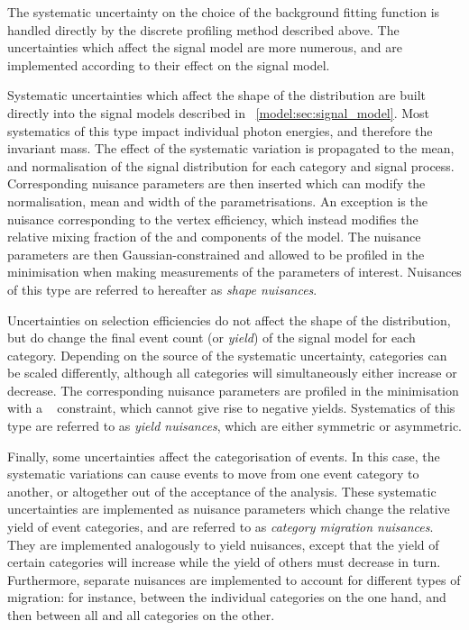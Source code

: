The systematic uncertainty on the choice of the background fitting function is handled directly by the discrete profiling method described above. The uncertainties which affect the signal model are more numerous, and are implemented according to their effect on the signal model.

Systematic uncertainties which affect the shape of the \mgg distribution are built directly into the signal models described in \Sec~\ref{model:sec:signal_model}. Most systematics of this type impact individual photon energies, and therefore the invariant mass. The effect of the systematic variation is propagated to the mean, \effSigma and normalisation of the signal \mgg distribution for each category and signal process. Corresponding nuisance parameters are then inserted which can modify the normalisation, mean and width of the \DCBpG parametrisations. An exception is the nuisance corresponding to the vertex efficiency, which instead modifies the relative mixing fraction of the \RV and \WV components of the model. The nuisance parameters are then Gaussian-constrained and allowed to be profiled in the \NLL minimisation when making measurements of the parameters of interest. Nuisances of this type are referred to hereafter as \emph{shape nuisances}. 

Uncertainties on selection efficiencies do not affect the shape of the \mgg distribution, but do change the final event count (or \emph{yield}) of the signal model for each category. Depending on the source of the systematic uncertainty, categories can be scaled differently, although all categories will simultaneously either increase or decrease. The corresponding nuisance parameters are profiled in the \NLL minimisation with a \lnN~\cite{1987lognormal} constraint, which cannot give rise to negative yields. Systematics of this type are referred to as \emph{yield nuisances}, which are either symmetric or asymmetric. %

Finally, some uncertainties affect the categorisation of events. In this case, the systematic variations can cause events to move from one event category to another, or altogether out of the acceptance of the analysis. These systematic uncertainties are implemented as nuisance parameters which change the relative yield of event categories, and are referred to as \emph{category migration nuisances}. They are implemented analogously to yield nuisances, except that the yield of certain categories will increase while the yield of others must decrease in turn. Furthermore, separate nuisances are implemented to account for different types of migration: for instance, between the individual \VBFTag categories on the one hand, and then between all \VBFTag and all \Untagged categories on the other.


